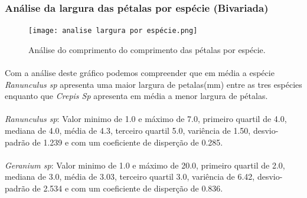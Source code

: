 \documentclass{article}
\begin{document}
\paragraph{}
\paragraph{}
\paragraph{}
\paragraph{}
\paragraph{}
\paragraph{}
\subsubsection{Análise da largura das pétalas por espécie (Bivariada)}

\begin{figure}[h]
       \centering %
        \texttt{[image: analise largura por espécie.png]}
       \caption{Análise do comprimento do comprimento das pétalas por espécie.}
       \label{fig:logo}
    \end{figure}

\paragraph{} Com a análise deste gráfico podemos compreender que em média a espécie \textit{Ranunculus sp} apresenta uma maior largura de petalas(mm) entre as tres espécies enquanto que \textit{Crepis Sp} apresenta em média a menor largura de pétalas.

\paragraph{}\textit{Ranunculus sp}: Valor minimo de 1.0 e máximo de 7.0, primeiro quartil de 4.0, mediana de 4.0, média de 4.3,  terceiro quartil 5.0, variência de 1.50, desvio-padrão de 1.239 e com um coeficiente de disperção de 0.285.

\paragraph{} \textit{Geranium sp}: Valor minimo de 1.0 e máximo de 20.0, primeiro quartil de 2.0, mediana de 3.0, média de 3.03,  terceiro quartil 3.0, variência de 6.42, desvio-padrão de 2.534 e com um coeficiente de disperção de 0.836.
\end{document}
